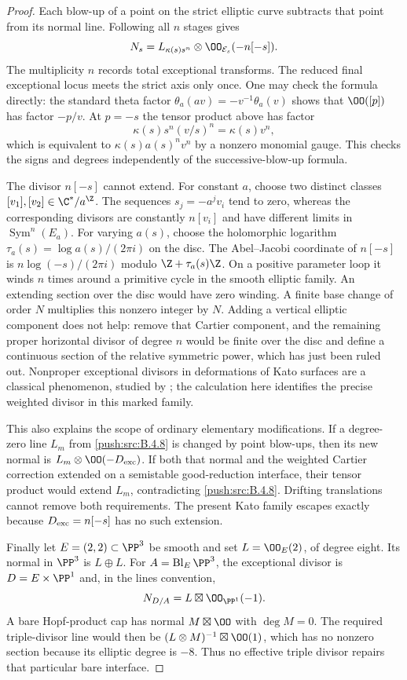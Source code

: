 \begin{proof}
Each blow-up of a point on the strict elliptic curve subtracts that
point from its normal line. Following all $n$ stages gives
\[
 N_s=L_{\kappa(s)s^n}\otimes\OO_{\mathcal E_s}(-n[-s]).
\]
The multiplicity $n$ records total exceptional transforms.
The reduced final exceptional locus meets the strict axis only once.
One may check the formula directly: the standard theta factor
$\theta_a(av)=-v^{-1}\theta_a(v)$ shows that $\OO([p])$
has factor $-p/v$. At $p=-s$ the tensor product above has factor
\[
 \kappa(s)s^n(v/s)^n=\kappa(s)v^n,
\]
which is equivalent to $\kappa(s)a(s)^n v^n$ by a nonzero monomial
gauge. This checks the signs and degrees independently of the
successive-blow-up formula.

The divisor $n[-s]$ cannot extend. For constant $a$, choose two
distinct classes $[v_1],[v_2]\in\C^*/a^\Z$.
The sequences $s_j=-a^jv_i$ tend to zero, whereas the corresponding
divisors are constantly $n[v_i]$ and have different limits in
$\operatorname{Sym}^n(E_a)$.
For varying $a(s)$, choose the holomorphic logarithm
$\tau_a(s)=\log a(s)/(2\pi i)$ on the disc.
The Abel--Jacobi coordinate of $n[-s]$ is
$n\log(-s)/(2\pi i)$ modulo $\Z+\tau_a(s)\Z$.
On a positive parameter loop it winds $n$ times around a primitive
cycle in the smooth elliptic family. An extending section over the
disc would have zero winding. A finite base change of order $N$
multiplies this nonzero integer by $N$.
Adding a vertical elliptic component does not help: remove that
Cartier component, and the remaining proper horizontal divisor of
degree $n$ would be finite over the disc and define a continuous
section of the relative symmetric power, which has just been ruled
out. Nonproper exceptional divisors in deformations of Kato surfaces
are a classical phenomenon, studied by
\citet[Section 1.2]{DlousskyTeleman2012AB}; the calculation here
identifies the precise weighted divisor in this marked family.

This also explains the scope of ordinary elementary modifications.
If a degree-zero line $L_m$ from \ref{push:src:B.4.8} is changed by point blow-ups,
then its new normal is $L_m\otimes\OO(-D_{\rm exc})$.
If both that normal and the weighted Cartier correction extended on
a semistable good-reduction interface, their tensor product would
extend $L_m$, contradicting \ref{push:src:B.4.8}. Drifting translations cannot
remove both requirements. The present Kato family escapes exactly
because $D_{\rm exc}=n[-s]$ has no such extension.

Finally let $E=(2,2)\subset\PP^3$ be smooth and set
$L=\OO_E(2)$, of degree eight. Its normal in $\PP^3$ is
$L\oplus L$. For $A=\operatorname{Bl}_E\PP^3$, the exceptional
divisor is $D=E\times\PP^1$ and, in the lines convention,
\[
 N_{D/A}=L\boxtimes\OO_{\PP^1}(-1).
\]
A bare Hopf-product cap has normal $M\boxtimes\OO$ with
$\deg M=0$. The required triple-divisor line would then be
$(L\otimes M)^{-1}\boxtimes\OO(1)$, which has no nonzero section
because its elliptic degree is $-8$. Thus no effective triple divisor
repairs that particular bare interface.


\end{proof}
